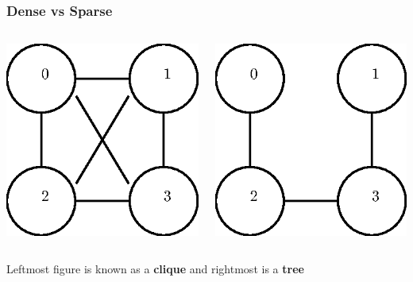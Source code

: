 \documentclass[article]{beamer}
\begin{document}
\begin{frame}
	\frametitle{Dense vs Sparse}
	\begin{columns}
			\begin{center}
		\includegraphics[scale=0.8]{./figures/dense.eps}
		\end{center}
			\begin{center}
			\includegraphics[scale=0.8]{./figures/sparse.eps}
			\end{center}
	\end{columns}
	
	\vspace{8mm}	
	
	\begin{flushright} 
	Leftmost figure is known as a \textbf{clique} and rightmost is a \textbf{tree}
	\end{flushright}
\end{frame}
\end{document}
